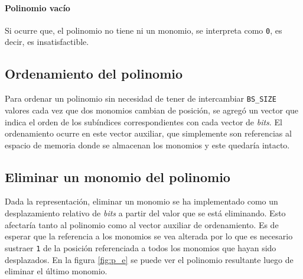 \paragraph{Polinomio vacío} Si ocurre que, el polinomio no tiene ni un monomio, se interpreta como \texttt{0}, es decir, es insatisfactible.

\subsection{Ordenamiento del polinomio}

Para ordenar un polinomio sin necesidad de tener de intercambiar \texttt{BS\_SIZE} valores cada vez que dos monomios cambian de posición, se agregó un vector que indica el orden de los subíndices correspondientes con cada vector de \textit{bits}. El ordenamiento ocurre en este vector auxiliar, que simplemente son referencias al espacio de memoria donde se almacenan los monomios y este quedaría intacto.

\subsection{Eliminar un monomio del polinomio}

Dada la representación, eliminar un monomio se ha implementado como un desplazamiento relativo de \textit{bits} a partir del valor que se está eliminando. Esto afectaría tanto al polinomio como al vector auxiliar de ordenamiento. Es de esperar que la referencia a los monomios se vea alterada por lo que es necesario sustraer \texttt{1} de la posición referenciada a todos los monomios que hayan sido desplazados. En la figura \ref{fig:p_e} se puede ver el polinomio resultante luego de eliminar el último monomio.

